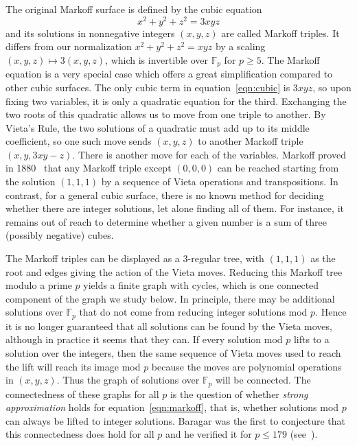 \documentclass[AHL, Unicode, longabstracts, published]{cedram}
\newcommand{\F}{\mathbb{F}}
\begin{document}
The original Markoff surface is defined by the cubic equation
\begin{equation}\label{eqn:cubic}
x^2+y^2+z^2=3xyz
\end{equation}
and its solutions in nonnegative integers $(x,y,z)$ are called Markoff triples. It differs from our normalization $x^2+y^2+z^2 = xyz$ by a scaling $(x,y,z) \mapsto 3(x,y,z)$, which is invertible over $\F_p$ for $p \geq 5$. The Markoff equation is a very special case which offers a great simplification compared to other cubic surfaces. The only cubic term in equation~\eqref{eqn:cubic} is $3xyz$, so upon fixing two variables, it is only a quadratic equation for the third. Exchanging the two roots of this quadratic allows us to move from one triple to another. By Vieta's Rule, the two solutions of a quadratic must add up to its middle coefficient, so one such move sends $(x,y,z)$ to another Markoff triple $(x,y,3xy -z)$. There is another move for each of the variables. Markoff proved in 1880~\cite{Mark} that any Markoff triple except $(0,0,0)$ can be reached starting from the solution $(1,1,1)$ by a sequence of Vieta operations and transpositions. In contrast, for a general cubic surface, there is no known method for deciding whether there are integer solutions, let alone finding all of them. For instance, it remains out of reach to determine whether a given number is a sum of three (possibly negative) cubes.


The Markoff triples can be displayed as a $3$-regular tree, with $(1,1,1)$ as the root and edges giving the action of the Vieta moves. Reducing this Markoff tree modulo a prime $p$ yields a finite graph with cycles, which is one connected component of the graph we study below. In principle, there may be additional solutions over $\F_p$ that do not come from reducing integer solutions mod $p$. Hence it is no longer guaranteed that all solutions can be found by the Vieta moves, although in practice it seems that they can. If every solution mod $p$ lifts to a solution over the integers, then the same sequence of Vieta moves used to reach the lift will reach its image mod $p$ because the moves are polynomial operations in $(x,y,z)$. Thus the graph of solutions over $\F_p$ will be connected. The connectedness of these graphs for all $p$ is the question of whether \emph{strong approximation} holds for equation~\eqref{eqn:markoff}, that is, whether solutions mod $p$ can always be lifted to integer solutions. Baragar was the first to conjecture that this connectedness does hold for all $p$ and he verified it for $p \leq 179$ (see~\cite[p.~124]{Bar}).
\end{document}
